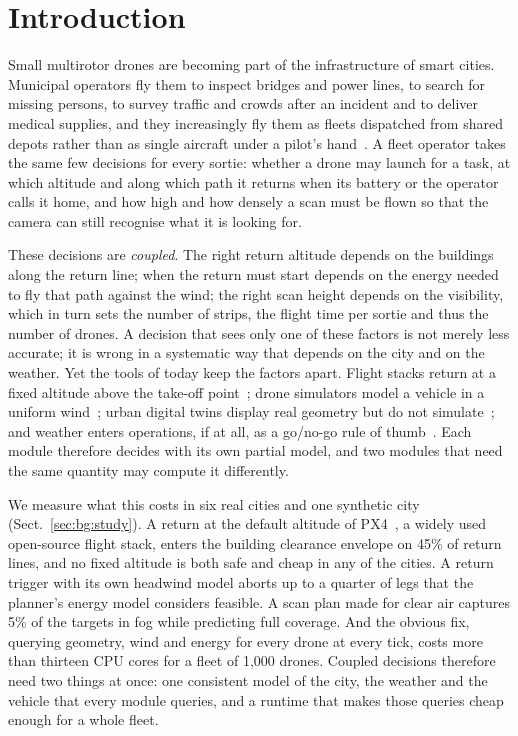 \section{Introduction}\label{sec:intro}

Small multirotor drones are becoming part of the infrastructure of smart cities. Municipal operators fly them to
inspect bridges and power lines, to search for missing persons, to survey traffic and crowds after an incident and to
deliver medical supplies, and they increasingly fly them as fleets dispatched from shared depots rather than as single
aircraft under a pilot's hand~\cite{mohamed2020uav,gharibi2016internet,prevot2016utm}. A fleet operator takes the same
few decisions for every sortie: whether a drone may launch for a task, at which altitude and along which path it
returns when its battery or the operator calls it home, and how high and how densely a scan must be flown so that the
camera can still recognise what it is looking for.

These decisions are \emph{coupled}. The right return altitude depends on the buildings along the return line; when the
return must start depends on the energy needed to fly that path against the wind; the right scan height depends on the
visibility, which in turn sets the number of strips, the flight time per sortie and thus the number of drones. A
decision that sees only one of these factors is not merely less accurate; it is wrong in a systematic way that depends
on the city and on the weather. Yet the tools of today keep the factors apart. Flight stacks return at a fixed
altitude above the take-off point~\cite{meier2015px4}; drone simulators model a vehicle in a uniform
wind~\cite{shah2017airsim,koenig2004gazebo}; urban digital twins display real geometry but do not
simulate~\cite{batty2018digitaltwins,ketzler2020digitaltwins}; and weather enters operations, if at all, as a go/no-go
rule of thumb~\cite{gao2021weather}. Each module therefore decides with its own partial model, and two modules that
need the same quantity may compute it differently.

We measure what this costs in six real cities and one synthetic city (Sect.~\ref{sec:bg:study}). A return at the default altitude of
PX4~\cite{meier2015px4}, a widely used open-source flight stack, enters the building clearance envelope on 45\% of return lines, and no fixed altitude is both safe and
cheap in any of the cities. A return trigger with its own headwind model aborts up to a quarter of legs that the
planner's energy model considers feasible. A scan plan made for clear air captures 5\% of the targets in fog while
predicting full coverage. And the obvious fix, querying geometry, wind and energy for every drone at every tick, costs
more than thirteen CPU cores for a fleet of 1,000 drones. Coupled decisions therefore need two things at once: one
consistent model of the city, the weather and the vehicle that every module queries, and a runtime that makes those
queries cheap enough for a whole fleet.

